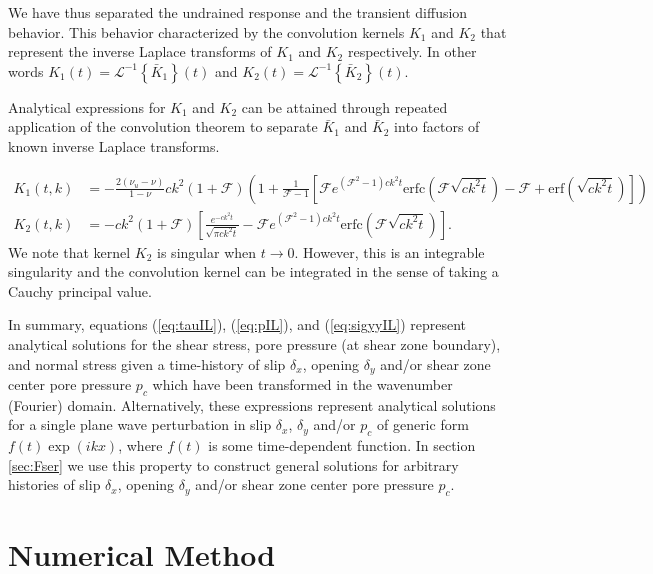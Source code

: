 \documentclass[draft]{agujournal2019}
\begin{document}
We have thus separated the undrained response and the transient diffusion behavior. This behavior  characterized by the convolution kernels $K_1$ and $K_2$ that represent the inverse Laplace transforms of $K_1$ and $K_2$ respectively. In other words $K_1(t) =  \mathcal{L}^{-1} \left\{ \bar{K}_1 \right\} (t)$ and $K_2(t) =  \mathcal{L}^{-1} \left\{ \bar{K}_2 \right\} (t)$.

Analytical expressions for $K_1$ and $K_2$ can be attained through repeated application of the convolution theorem to separate $\bar{K}_1$ and $\bar{K}_2$ into factors of known inverse Laplace transforms.

\begin{align}
 K_1(t,k) & =  - \frac{2 (\nu_u - \nu)}{1-\nu} c k^2 (1 + \mathcal{F}) \left( 1 + \frac{1}{\mathcal{F} - 1} \left[ \mathcal{F} e^{ (\mathcal{F}^2-1)c k^2 t } \text{erfc}\left( \mathcal{F}\sqrt{c k^2 t } \right) - \mathcal{F}  + \text{erf} \left( \sqrt{c k^2 t } \right)  \right]   \right) \label{eq:K1}  \\ 
K_2(t,k) & =  - c k^2 (1 + \mathcal{F}) \left[ \frac{e^{-c k^2 t}}{\sqrt{\pi c k^2 t}} - \mathcal{F} e^{ (\mathcal{F}^2-1)c k^2 t } \text{erfc}\left( \mathcal{F}\sqrt{c k^2 t } \right)  \right]  \label{eq:K2}    .
\end{align}	
We note that kernel $K_2$ is singular when $t \rightarrow 0$. However, this is an integrable singularity and the convolution kernel can be integrated in the sense of taking a Cauchy principal value.

In summary, equations (\ref{eq:tauIL}), (\ref{eq:pIL}), and (\ref{eq:sigyyIL}) represent analytical solutions for the shear stress, pore pressure (at shear zone boundary), and normal stress given a time-history of slip $\delta_x$, opening $\delta_y$ and/or shear zone center pore pressure $p_c$ which have been transformed in the wavenumber (Fourier) domain. Alternatively, these expressions represent analytical solutions for a single plane wave perturbation in slip $\delta_x$, $\delta_y$ and/or $p_c$ of generic form $f(t)\exp(ikx)$, where $f(t)$ is some time-dependent function. In section \ref{sec:Fser} we use this property to construct general solutions for arbitrary histories of slip $\delta_x$, opening $\delta_y$ and/or shear zone center pore pressure $p_c$.

\section{Numerical Method} \label{sec:num}
\end{document}
